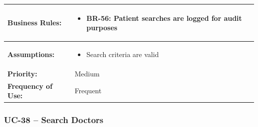 \documentclass[12pt,a4paper]{article}
\begin{document}
\begin{longtable}{|p{4.5cm}|p{10.5cm}|}
\hline
\textbf{Business Rules:} &
\begin{itemize}
  \item BR-56: Patient searches are logged for audit purposes
\end{itemize} \\
\hline
\textbf{Assumptions:} &
\begin{itemize}
  \item Search criteria are valid
\end{itemize} \\
\hline
\textbf{Priority:} & Medium \\
\hline
\textbf{Frequency of Use:} & Frequent \\
\hline
\end{longtable}

\subsubsection{UC-38 – Search Doctors}
\end{document}
